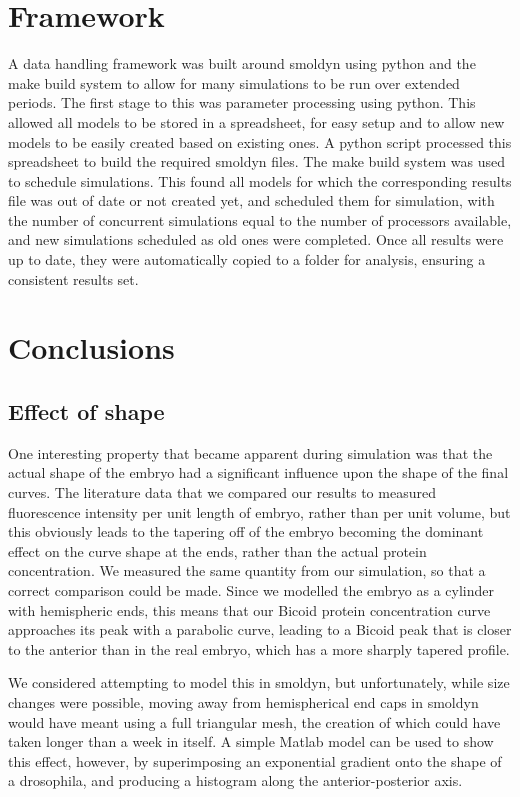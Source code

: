 \documentclass[11pt,a4paper,twocolumn]{article}
\begin{document}
\section{Framework}
A data handling framework was built around smoldyn using python and the make build system to allow for many simulations to be run over extended periods. The first stage to this was parameter processing using python. This allowed all models to be stored in a spreadsheet, for easy setup and to allow new models to be easily created based on existing ones. A python script processed this spreadsheet to build the required smoldyn files. The make build system was used to schedule simulations. This found all models for which the corresponding results file was out of date or not created yet, and scheduled them for simulation, with the number of concurrent simulations equal to the number of processors available, and new simulations scheduled as old ones were completed. Once all results were up to date, they were automatically copied to a folder for analysis, ensuring a consistent results set.

\section{Conclusions}
\subsection{Effect of shape}
One interesting property that became apparent during simulation was that the actual shape of the embryo had a significant influence upon the shape of the final curves. The literature data that we compared our results to measured fluorescence intensity per unit length of embryo, rather than per unit volume, but this obviously leads to the tapering off of the embryo becoming the dominant effect on the curve shape at the ends, rather than the actual protein concentration. We measured the same quantity from our simulation, so that a correct comparison could be made. Since we modelled the embryo as a cylinder with hemispheric ends, this means that our Bicoid protein concentration curve approaches its peak with a parabolic curve, leading to a Bicoid peak that is closer to the anterior than in the real embryo, which has a more sharply tapered profile.

We considered attempting to model this in smoldyn, but unfortunately, while size changes were possible, moving away from hemispherical end caps in smoldyn would have meant using a full triangular mesh, the creation of which could have taken longer than a week in itself. A simple Matlab model can be used to show this effect, however, by superimposing an exponential gradient onto the shape of a drosophila, and producing a histogram along the anterior-posterior axis.
\nocite{*}


\end{document}
